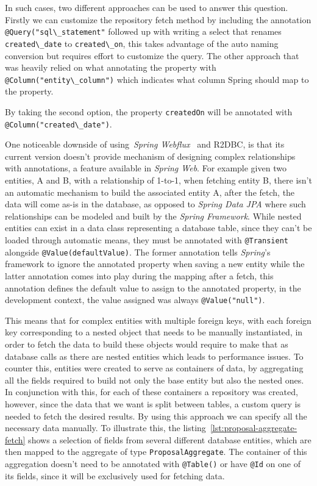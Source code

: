 In such cases, two different approaches can be used to answer this question. Firstly we can customize the repository fetch method by including the annotation \lstinline{@Query("sql\_statement"} followed up with writing a select that renames \lstinline{created\_date} to \lstinline{created\_on}, this takes advantage of the auto naming conversion but requires effort to customize the query. The other approach that was heavily relied on what annotating the property with \lstinline{@Column("entity\_column")} which indicates what column Spring should map to the property.

By taking the second option, the property \lstinline{createdOn} will be annotated with \lstinline{@Column("created\_date")}.


One noticeable downside of using~\textit{Spring Webflux}~\cite{spring-webflux} and R2DBC, is that its current version doesn't provide mechanism of designing complex relationships with annotations, a feature available in \textit{Spring Web}. For example given two entities, A and B, with a relationship of 1-to-1, when fetching entity B, there isn't an automatic mechanism to build the associated entity A, after the fetch, the data will come as-is in the database, as opposed to \textit{Spring Data JPA} where such relationships can be modeled and built by the \textit{Spring Framework}. 
While nested entities can exist in a data class representing a database table, since they can't be loaded through automatic means, they must be annotated with \lstinline{@Transient} alongside \lstinline{@Value(defaultValue)}. 
The former annotation tells \textit{Spring}'s framework to ignore the annotated property when saving a new entity while the latter annotation comes into play during the mapping after a fetch, this annotation defines the default value to assign to the annotated property, in the development context, the value assigned was always \lstinline{@Value("null")}. 

This means that for complex entities with multiple foreign keys, with each foreign key corresponding to a nested object that needs to be manually instantiated, in order to fetch the data to build these objects would require to make that as database calls as there are nested entities which leads to performance issues. To counter this, entities were created to serve as containers of data, by aggregating all the fields required to build not only the base entity but also the nested ones. 
In conjunction with this, for each of these containers a repository was created, however, since the data that we want is split between tables, a custom query is needed to fetch the desired results. By using this approach we can specify all the necessary data manually. To illustrate this, the listing~\ref{lst:proposal-aggregate-fetch} shows a selection of fields from several different database entities, which are then mapped to the aggregate of type \lstinline{ProposalAggregate}. The container of this aggregation doesn't need to be annotated with \lstinline{@Table()} or have \lstinline{@Id} on one of its fields, since it will be exclusively used for fetching data.

